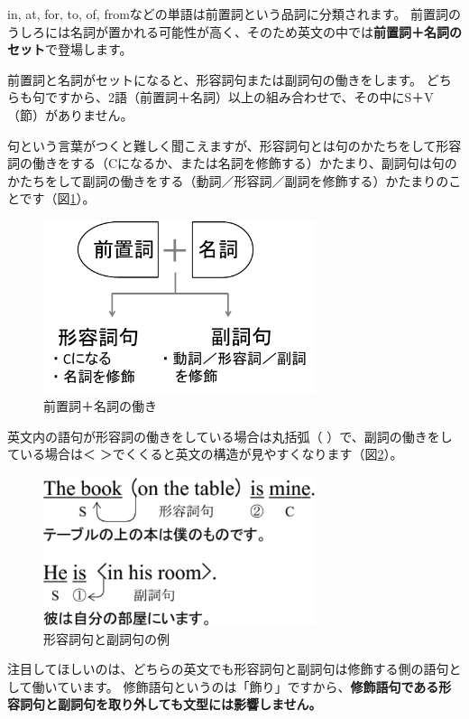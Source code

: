 \documentclass[12pt,titlepage]{jsarticle}
\begin{document}
 in, at, for, to, of, fromなどの単語は前置詞という品詞に分類されます。
 前置詞のうしろには名詞が置かれる可能性が高く、そのため英文の中では{\bf 前置詞＋名詞のセット}で登場します。

 前置詞と名詞がセットになると、形容詞句または副詞句の働きをします。
 どちらも句ですから、2語（前置詞＋名詞）以上の組み合わせで、その中にS＋V（節）がありません。

 句という言葉がつくと難しく聞こえますが、形容詞句とは句のかたちをして形容詞の働きをする（Cになるか、または名詞を修飾する）かたまり、副詞句は句のかたちをして副詞の働きをする（動詞／形容詞／副詞を修飾する）かたまりのことです（図\ref{fig14}）。
  \begin{figure}[htbp]
   \begin{center}
    \includegraphics[width=8cm]{./figure/fig14.pdf}
    \caption{前置詞＋名詞の働き}
    \label{fig14}
   \end{center}
  \end{figure}

  英文内の語句が形容詞の働きをしている場合は丸括弧（ ）で、副詞の働きをしている場合は＜ ＞でくくると英文の構造が見やすくなります（図\ref{fig15}）。
  \begin{figure}[htbp]
   \begin{center}
    \includegraphics[width=8cm]{./figure/fig15.pdf}
    \caption{形容詞句と副詞句の例}
    \label{fig15}
   \end{center}
  \end{figure}

  注目してほしいのは、どちらの英文でも形容詞句と副詞句は修飾する側の語句として働いています。
  修飾語句というのは「飾り」ですから、{\bf 修飾語句である形容詞句と副詞句を取り外しても文型には影響しません。}
\end{document}
